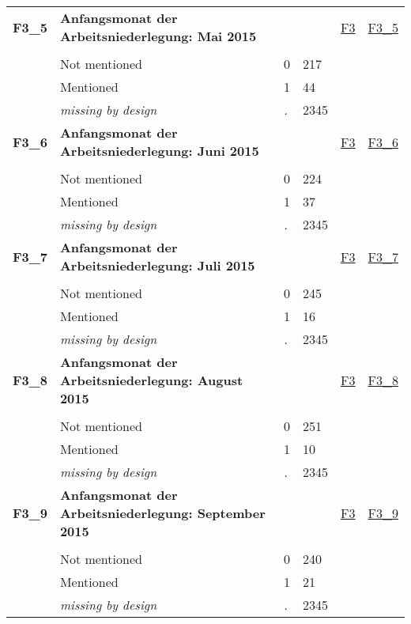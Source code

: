 \begin{longtable}{| L{2.45cm} | L{6cm} | C{1.5cm} | R{1cm} | C{2.25cm} | C{2.25cm} |}
   \midrule
\textbf{F3\_5}\label{var:F3:5} & \textbf{Anfangsmonat der Arbeitsniederlegung: Mai 2015} &  &  & \hyperref[F3]{F3} & \hyperref[var:suf:F3:5]{F3\_5} \\ 
   &  &  &  &  &  \\ 
   & Not mentioned & 0 & 217 &  &  \\ 
   & Mentioned & 1 & 44 &  &  \\ 
   & \textit{missing by design} & \textit{.} & 2345 &  &  \\ 
   \midrule
\textbf{F3\_6}\label{var:F3:6} & \textbf{Anfangsmonat der Arbeitsniederlegung: Juni 2015} &  &  & \hyperref[F3]{F3} & \hyperref[var:suf:F3:6]{F3\_6} \\ 
   &  &  &  &  &  \\ 
   & Not mentioned & 0 & 224 &  &  \\ 
   & Mentioned & 1 & 37 &  &  \\ 
   & \textit{missing by design} & \textit{.} & 2345 &  &  \\ 
   \midrule
\textbf{F3\_7}\label{var:F3:7} & \textbf{Anfangsmonat der Arbeitsniederlegung: Juli 2015} &  &  & \hyperref[F3]{F3} & \hyperref[var:suf:F3:7]{F3\_7} \\ 
   &  &  &  &  &  \\ 
   & Not mentioned & 0 & 245 &  &  \\ 
   & Mentioned & 1 & 16 &  &  \\ 
   & \textit{missing by design} & \textit{.} & 2345 &  &  \\ 
   \midrule
\textbf{F3\_8}\label{var:F3:8} & \textbf{Anfangsmonat der Arbeitsniederlegung: August 2015} &  &  & \hyperref[F3]{F3} & \hyperref[var:suf:F3:8]{F3\_8} \\ 
   &  &  &  &  &  \\ 
   & Not mentioned & 0 & 251 &  &  \\ 
   & Mentioned & 1 & 10 &  &  \\ 
   & \textit{missing by design} & \textit{.} & 2345 &  &  \\ 
   \midrule
\textbf{F3\_9}\label{var:F3:9} & \textbf{Anfangsmonat der Arbeitsniederlegung: September 2015} &  &  & \hyperref[F3]{F3} & \hyperref[var:suf:F3:9]{F3\_9} \\ 
   &  &  &  &  &  \\ 
   & Not mentioned & 0 & 240 &  &  \\ 
   & Mentioned & 1 & 21 &  &  \\ 
   & \textit{missing by design} & \textit{.} & 2345 &  &  \\ 

\end{longtable}
